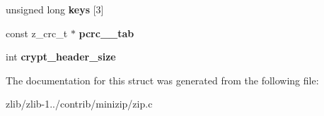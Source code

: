 \begin{DoxyCompactItemize}
\item 
\hypertarget{structcurfile64__info_a1c4fff54045c80444eb155d42f6e58de}{unsigned long {\bfseries keys} \mbox{[}3\mbox{]}}\label{structcurfile64__info_a1c4fff54045c80444eb155d42f6e58de}

\item 
\hypertarget{structcurfile64__info_ad233b27925eb726ed3f225fc4abb4fac}{const z\+\_\+crc\+\_\+t $\ast$ {\bfseries pcrc\+\_\+\_\+tab}}\label{structcurfile64__info_ad233b27925eb726ed3f225fc4abb4fac}

\item 
\hypertarget{structcurfile64__info_a17e9931ff5683fded26eb3d99d80bf0e}{int {\bfseries crypt\+\_\+header\+\_\+size}}\label{structcurfile64__info_a17e9931ff5683fded26eb3d99d80bf0e}

\end{DoxyCompactItemize}


The documentation for this struct was generated from the following file\+:\begin{DoxyCompactItemize}
\item 
zlib/zlib-\/1../contrib/minizip/zip.\+c\end{DoxyCompactItemize}
